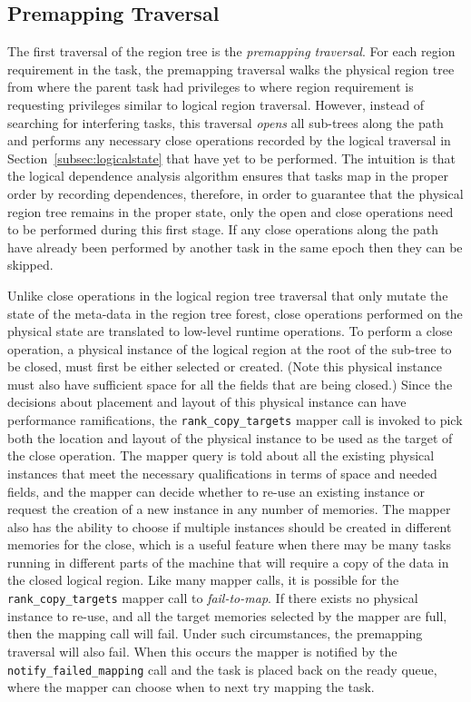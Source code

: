 \subsection{Premapping Traversal}
\label{sec:premapping}
The first traversal of the region tree is
the {\em premapping traversal}. For each
region requirement in the task, the 
premapping traversal walks the physical
region tree from where the parent task had
privileges to where region requirement is
requesting privileges similar to logical
region traversal. However, instead of searching
for interfering tasks, this traversal 
{\em opens} all sub-trees along the path and
performs any necessary close operations 
recorded by the logical traversal in 
Section~\ref{subsec:logicalstate} that have
yet to be performed. The intuition is that
the logical dependence analysis algorithm ensures
that tasks map in the proper order by 
recording dependences, therefore, in order
to guarantee that the physical region tree
remains in the proper state, only the open
and close operations need to be performed
during this first stage. If any close 
operations along the path have already been
performed by another task in the same epoch
then they can be skipped.

Unlike close operations in the logical region
tree traversal that only mutate the state
of the meta-data in the region tree forest,
close operations performed on the physical
state are translated to low-level runtime
operations.  To perform a close operation,
a physical instance of the logical region 
at the root of the sub-tree to be closed,
must first be either selected or created.
(Note this physical instance must also
have sufficient space for all the fields
that are being closed.) Since the decisions
about placement and layout of this physical
instance can have performance ramifications,
the {\tt rank\_copy\_targets} mapper call
is invoked to pick both the location and 
layout of the physical instance to be used
as the target of the close operation.
The mapper query is told about all the existing
physical instances that meet the necessary
qualifications in terms of space and needed
fields, and the mapper can decide whether to
re-use an existing instance or request the
creation of a new instance in any number of
memories.  The mapper also has the ability to
choose if multiple instances should be created
in different memories for the close, which
is a useful feature when there may be many
tasks running in different parts of the machine
that will require a copy of the data in the closed 
logical region. Like many mapper calls, it is
possible for the {\tt rank\_copy\_targets} mapper
call to {\em fail-to-map}. If there exists no
physical instance to re-use, and all the target
memories selected by the mapper are full, then
the mapping call will fail. Under such 
circumstances, the premapping traversal will
also fail. When this occurs the mapper is notified
by the {\tt notify\_failed\_mapping} call
and the task is placed back on the ready
queue, where the mapper can choose when to 
next try mapping the task.

